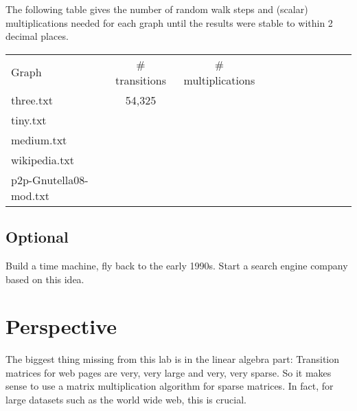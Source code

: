 \documentclass{tufte-handout}
\begin{document}
\bigskip The following table gives the number of random walk steps and
(scalar) multiplications needed for each graph until the results were
stable to within 2 decimal places.

\medskip
\begin{fullwidth}
\small
\begin{tabular}{lcccccccccc}
Graph & \# transitions  & \# multiplications \\
three.txt & 54,325 \\
tiny.txt &\\
medium.txt &\\
wikipedia.txt & \\
p2p-Gnutella08-mod.txt
\end{tabular}
\end{fullwidth}

\subsection{Optional}

Build a time machine, fly back to the early 1990s.
Start a search engine company based on this idea.


\newpage
\section{Perspective}

The biggest thing missing from this lab is in the linear algebra part:
Transition matrices for web pages are very, very large and very, very
sparse.
So it makes sense to use a matrix multiplication algorithm for sparse
matrices.
In fact, for large datasets such as the world wide web, this is
crucial.
\end{document}
